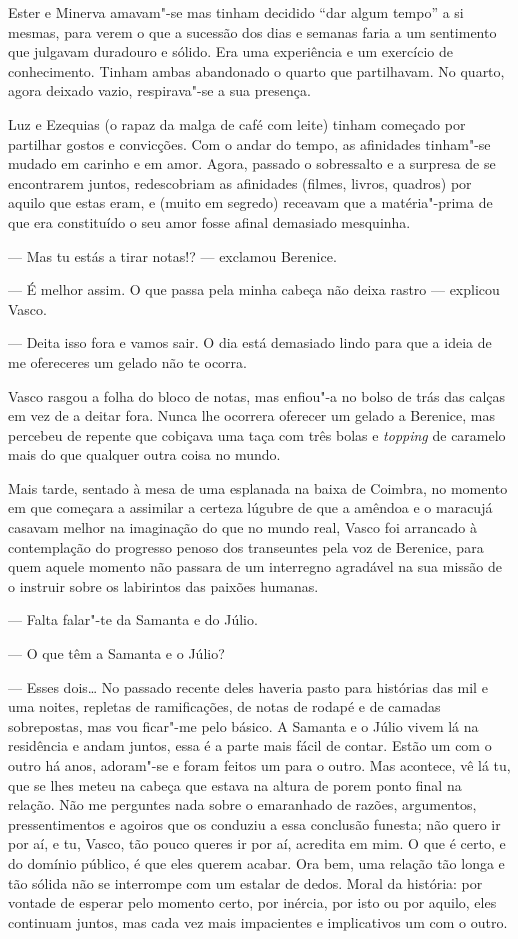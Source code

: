 Ester e Minerva amavam"-se mas tinham decidido ``dar algum tempo'' a si
mesmas, para verem o que a sucessão dos dias e semanas faria a um
sentimento que julgavam duradouro e sólido. Era uma experiência e um
exercício de conhecimento. Tinham ambas abandonado o quarto que
partilhavam. No quarto, agora deixado vazio, respirava"-se a sua
presença.

Luz e Ezequias (o rapaz da malga de café com leite) tinham começado
por partilhar gostos e convicções. Com o andar do tempo, as afinidades
tinham"-se mudado em carinho e em amor. Agora, passado o sobressalto e a
surpresa de se encontrarem juntos, redescobriam as afinidades (filmes,
livros, quadros) por aquilo que estas eram, e (muito em segredo) receavam que a matéria"-prima de que era constituído o seu amor fosse
afinal demasiado mesquinha.

--- Mas tu estás a tirar notas!? --- exclamou Berenice.

--- É melhor assim. O que passa pela minha cabeça não deixa rastro ---
  explicou Vasco.

--- Deita isso fora e vamos sair. O dia está demasiado lindo para que a
  ideia de me ofereceres um gelado não te ocorra.

  Vasco rasgou a folha
  do bloco de notas, mas enfiou"-a no bolso de trás das calças em vez de
  a deitar fora. Nunca lhe ocorrera oferecer um gelado a Berenice, mas
  percebeu de repente que cobiçava uma taça com três bolas e
  \emph{topping }de caramelo mais do que qualquer outra coisa no mundo.

Mais tarde, sentado à mesa de uma esplanada na baixa de Coimbra, no
momento em que começara a assimilar a certeza lúgubre de que a amêndoa e
o maracujá casavam melhor na imaginação do que no mundo real, Vasco foi
arrancado à contemplação do progresso penoso dos transeuntes pela voz
de Berenice, para quem aquele momento não passara de um interregno
agradável na sua missão de o instruir sobre os labirintos das paixões
humanas.

--- Falta falar"-te da Samanta e do Júlio.

--- O que têm a Samanta e o Júlio?

--- Esses dois\ldots{} No passado recente deles haveria pasto para histórias
  das mil e uma noites, repletas de ramificações, de notas de rodapé e
  de camadas sobrepostas, mas vou ficar"-me pelo básico. A Samanta e o Júlio vivem lá na residência e andam
juntos, essa é a parte mais fácil de contar. Estão um com o outro há
anos, adoram"-se e foram feitos um para o outro. Mas acontece, vê lá tu,
que se lhes meteu na cabeça que estava na altura de porem ponto final na
relação. Não me perguntes nada sobre o emaranhado de razões, argumentos,
pressentimentos e agoiros que os conduziu a essa conclusão funesta; não
quero ir por aí, e tu, Vasco, tão pouco queres ir por aí, acredita em
mim. O que é certo, e do domínio público, é que eles querem acabar. Ora
bem, uma relação tão longa e tão sólida não se interrompe com um estalar
de dedos. Moral
da história: por vontade de esperar pelo momento certo, por inércia, por
isto ou por aquilo, eles continuam juntos, mas cada vez mais impacientes
e implicativos um com o outro.

